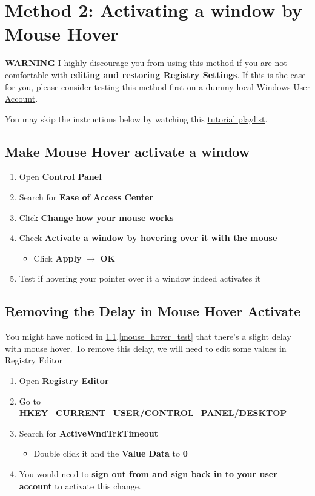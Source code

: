 \documentclass{article}
\begin{document}
\section{Method 2: Activating a window by Mouse Hover}
\label{section: method2}

\textbf{WARNING} I highly discourage you from using this method if you are not comfortable with \textbf{editing and restoring Registry Settings}. If this is the case for you, please consider testing this method first on a \href{https://support.microsoft.com/en-us/help/4026923/windows-10-create-a-local-user-or-administrator-account}{dummy local Windows User Account}. 

You may skip the instructions below by watching this  \href{https://www.youtube.com/watch?v=xScVYFD3c3A&list=PLVUbtDqG7l80KYJ2zmCmPpPKnN2rwKMex&index=3}{tutorial playlist}. 

\subsection{Make Mouse Hover activate a window}
\label{subsection: mouse_hover_enable}
\begin{enumerate}
   \item Open \textbf{Control Panel}
   \item Search for \textbf{Ease of Access Center}
   \item Click \textbf{Change how your mouse works}
   \item Check \textbf{Activate a window by hovering over it with the mouse}
   \begin{itemize}
     \item Click \textbf{Apply} $\rightarrow$ \textbf{OK}
   \end{itemize}
   \item Test if hovering your pointer over it a window indeed activates it
   \label{mouse_hover_test}
\end{enumerate}

\subsection{Removing the Delay in Mouse Hover Activate}

You might have noticed in \ref{subsection: mouse_hover_enable}.\ref{mouse_hover_test} that there's a slight delay with mouse hover. To remove this delay, we will need to edit some values in Registry Editor

\begin{enumerate}
   \item Open \textbf{Registry Editor}
   \item Go to \textbf{HKEY\_CURRENT\_USER/CONTROL\_PANEL/DESKTOP}
   \item Search for \textbf{ActiveWndTrkTimeout}
   \begin{itemize}
     \item Double click it and the \textbf{Value Data} to \textbf{0}
   \end{itemize}
   \item You would need to \textbf{sign out from and sign back in to your user account} to activate this change.
\end{enumerate}
\end{document}
